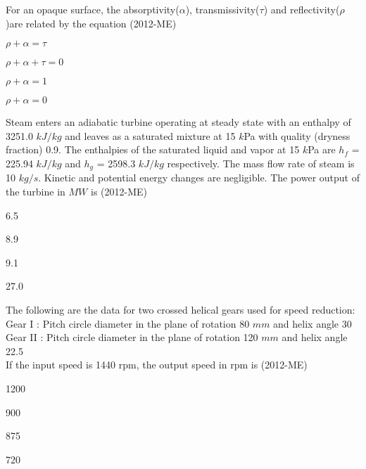 \item For an opaque surface, the absorptivity($\alpha$), transmissivity($\tau$) and reflectivity($\rho$)are related by the equation \hfill{(2012-ME)} 
                 \begin{enumerate}   
                     \begin{multicols}{4}       
\item $\rho + \alpha = \tau $
\item $\rho + \alpha + \tau = 0$
\item $\rho + \alpha = 1$
\item $\rho + \alpha = 0$

		     \end{multicols}                            
                         \end{enumerate}


\item Steam enters an adiabatic turbine operating at steady state with an enthalpy of 3251.0 $kJ/kg$ and leaves as a saturated mixture at 15 $k$Pa with quality (dryness fraction) 0.9. The enthalpies of the saturated liquid and vapor at 15 $k$Pa are $h_f$ = 225.94 $kJ/kg$ and $h_g$ = 2598.3 $kJ/kg$ respectively. The mass flow rate of steam is 10 $kg/s$. Kinetic and potential energy changes are negligible. The power output of the turbine in $MW$ is \hfill{(2012-ME)} 
  \begin{enumerate}   
 \begin{multicols}{4}          
\item 6.5
\item 8.9
\item 9.1
\item 27.0
\end{multicols}                            
   \end{enumerate}


\item The following are the data for two crossed helical gears used for speed reduction:\\
Gear I : Pitch circle diameter in the plane of rotation 80 $mm$ and helix angle 30\degree \\
Gear II : Pitch circle diameter in the plane of rotation 120 $mm$ and helix angle 22.5\degree \\
If the input speed is 1440 rpm, the output speed in rpm is \hfill{(2012-ME)} 
                 \begin{enumerate}   
 \begin{multicols}{4}                      
\item 1200
\item 900
\item 875
\item 720
\end{multicols}      \end{enumerate}



